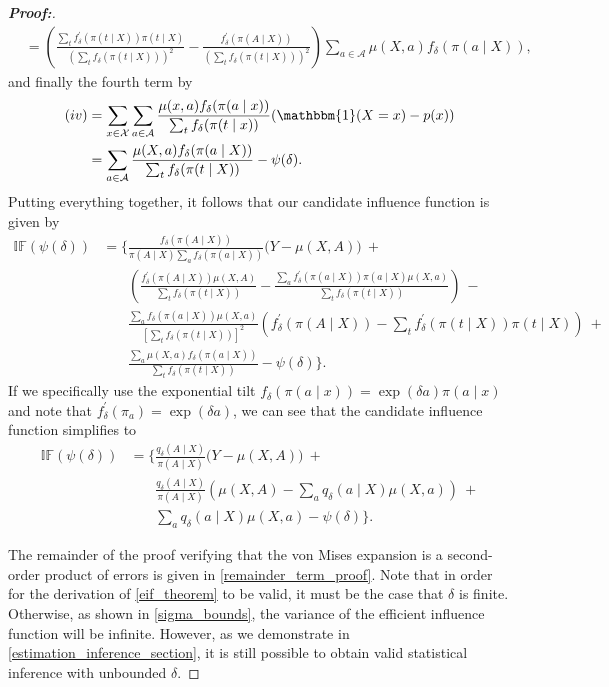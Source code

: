 \documentclass[11pt,twoside]{article}
\theoremstyle{definition}
\theoremstyle{remark}
\begin{document}
\begin{proof}[\textbf{Proof:}]
\begin{align*}
    &= \left(\frac{\sum_t f^{\prime}_\delta(\pi(t \mid X)) \pi(t \mid X) }{\left(\sum_t f_\delta(\pi(t \mid X)) \right)^2} - \frac{f^{\prime}_\delta(\pi(A \mid X))}{\left(\sum_t f_\delta(\pi(t \mid X)) \right)^2}\right)\sum_{a \in \mathcal{A}} \mu(X, a) f_\delta(\pi(a \mid X)),
\end{align*}
and finally the fourth term by
\begin{align*}
    (iv) &= \sum_{x \in \mathcal{X}} \sum_{a \in \mathcal{A}} \frac{\mu(x, a) f_\delta(\pi(a \mid x))}{\sum_t f_\delta(\pi(t \mid x))} (\mathbbm{1}(X = x) - p(x)) \\
    &= \sum_{a \in \mathcal{A}} \frac{\mu(X, a) f_\delta(\pi(a \mid X))}{\sum_t f_\delta(\pi(t \mid X))}  - \psi(\delta).
\end{align*}
Putting everything together, it follows that our candidate influence function is given by
\begin{align*}
    \mathbb{IF}(\psi(\delta)) &= \Bigg\{ \frac{f_\delta(\pi(A \mid X))}{\pi(A \mid X) \sum_a f_\delta(\pi(a \mid X))}\Big(Y - \mu(X, A) \Big) \: + \\
    &\phantom{{}={\Bigg\{}} \left( \frac{f^{\prime}_\delta(\pi(A \mid X)) \mu(X, A)}{\sum_t f_\delta(\pi(t \mid X))} - \frac{\sum_a f^{\prime}_\delta(\pi(a \mid X)) \pi(a \mid X) \mu(X, a)}{\sum_t f_\delta(\pi(t \mid X))} \right) \: - \\
    &\phantom{{}={\Bigg\{}}  \frac{\sum_a f_\delta( \pi( a \mid X)) \mu(X, a)}{\left[\sum_t f_\delta(\pi(t \mid X)) \right]^2} \left(f^\prime_\delta( \pi(A \mid X)) - \sum_t f^\prime_\delta( \pi(t \mid X)) \pi(t \mid X) \right) \: + \\
    &\phantom{{}={\Bigg\{}} \frac{\sum_a  \mu(X, a) f_\delta(\pi(a \mid X))}{\sum_t f_\delta(\pi(t \mid X))} - \psi(\delta) \Bigg\}.
\end{align*}
If we specifically use the exponential tilt $f_\delta( \pi(a \mid x)) = \exp(\delta a) \pi(a \mid x)$ and note that $f^\prime_\delta(\pi_a) = \exp(\delta a)$, we can see that the candidate influence function simplifies to
\begin{align*}
    \mathbb{IF}(\psi(\delta)) &= \Bigg\{ \frac{q_\delta(A \mid X)}{\pi(A \mid X)} \Big(Y - \mu(X, A) \Big) \: + \\
    &\phantom{{}={\Bigg\{}} \frac{q_\delta(A \mid X)}{\pi(A \mid X)}\left( \mu(X, A) - \sum_a q_\delta(a \mid X) \mu(X, a) \right) \: + \\
    &\phantom{{}={\Bigg\{}} \sum_a q_\delta(a \mid X) \mu(X, a)  - \psi(\delta) \Bigg\}.
\end{align*}

The remainder of the proof verifying that the von Mises expansion is a second-order product of errors is given in \cref{remainder_term_proof}. Note that in order for the derivation of \cref{eif_theorem} to be valid, it must be the case that $\delta$ is finite. Otherwise, as shown in \cref{sigma_bounds}, the variance of the efficient influence function will be infinite. However, as we demonstrate in \cref{estimation_inference_section}, it is still possible to obtain valid statistical inference with unbounded $\delta$.


\end{proof}
\end{document}
